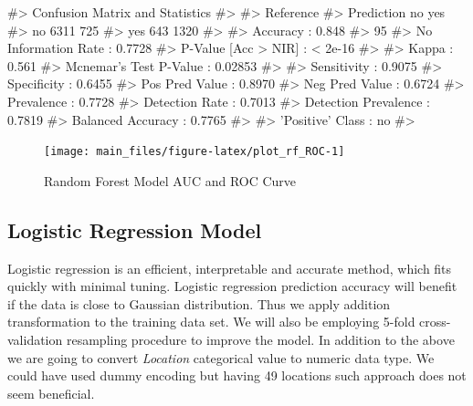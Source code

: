 \begin{Schunk}
\begin{Soutput}
#> Confusion Matrix and Statistics
#> 
#>           Reference
#> Prediction   no  yes
#>        no  6311  725
#>        yes  643 1320
#>                                           
#>                Accuracy : 0.848           
#>                  95%
#>     No Information Rate : 0.7728          
#>     P-Value [Acc > NIR] : < 2e-16         
#>                                           
#>                   Kappa : 0.561           
#>  Mcnemar's Test P-Value : 0.02853         
#>                                           
#>             Sensitivity : 0.9075          
#>             Specificity : 0.6455          
#>          Pos Pred Value : 0.8970          
#>          Neg Pred Value : 0.6724          
#>              Prevalence : 0.7728          
#>          Detection Rate : 0.7013          
#>    Detection Prevalence : 0.7819          
#>       Balanced Accuracy : 0.7765          
#>                                           
#>        'Positive' Class : no              
#> 
\end{Soutput}
\end{Schunk}

\begin{Schunk}
\begin{figure}[H]

{\centering \texttt{[image: main\_files/figure-latex/plot\_rf\_ROC-1]} 

}

\caption[Random Forest Model AUC and ROC Curve]{Random Forest Model AUC and ROC Curve}\label{fig:plot_rf_ROC}
\end{figure}
\end{Schunk}

\hypertarget{logistic-regression-model}{%
\subsection{Logistic Regression Model}\label{logistic-regression-model}}

Logistic regression is an efficient, interpretable and accurate method,
which fits quickly with minimal tuning. Logistic regression prediction
accuracy will benefit if the data is close to Gaussian distribution.
Thus we apply addition transformation to the training data set. We will
also be employing 5-fold cross-validation resampling procedure to
improve the model. In addition to the above we are going to convert
\emph{Location} categorical value to numeric data type. We could have
used dummy encoding but having 49 locations such approach does not seem
beneficial.

